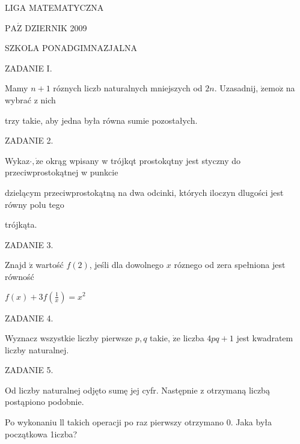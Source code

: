 \documentclass[a4paper,12pt]{article}
\begin{document}
LIGA MATEMATYCZNA

$\mathrm{P}\mathrm{A}\acute{\mathrm{Z}}$ DZIERNIK 2009

SZKOLA PONADGIMNAZJALNA

ZADANIE I.

Mamy $n+1$ róznych liczb naturalnych mniejszych od $2n$. Uzasadnij, $\dot{\mathrm{z}}\mathrm{e}\mathrm{m}\mathrm{o}\dot{\mathrm{z}}$ na wybrać z nich

trzy takie, aby jedna była równa sumie pozostałych.

ZADANIE 2.

Wykaz$\cdot, \dot{\mathrm{z}}\mathrm{e}$ okrąg wpisany w trójkqt prostokqtny jest styczny do przeciwprostokątnej w punkcie

dzielącym przeciwprostokątną na dwa odcinki, których iloczyn dlugości jest równy polu tego

trójkąta.

ZADANIE 3.

Znajd $\acute{\mathrm{z}}$ wartość $f(2)$, jeśli dla dowolnego $x$ róznego od zera spełniona jest równość

$f(x)+3f(\displaystyle \frac{1}{x})=x^{2}$

ZADANIE 4.

Wyznacz wszystkie liczby pierwsze $p, q$ takie, $\dot{\mathrm{z}}\mathrm{e}$ liczba $4pq+1$ jest kwadratem liczby naturalnej.

ZADANIE 5.

Od liczby naturalnej odjęto sumę jej cyfr. Następnie z otrzymaną liczbą postąpiono podobnie.

Po wykonaniu ll takich operacji po raz pierwszy otrzymano 0. Jaka była początkowa 1iczba?
\end{document}
